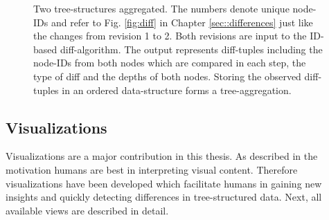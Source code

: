 \begin{figure}[tb]
\caption{\label{fig:aggregation} Two tree-structures aggregated. The numbers denote unique node-IDs and refer to Fig. \ref{fig:diff} in Chapter \ref{sec::differences} just like the changes from revision 1 to 2. Both revisions are input to the ID-based diff-algorithm. The output represents diff-tuples including the node-IDs from both nodes which are compared in each step, the type of diff and the depths of both nodes. Storing the observed diff-tuples in an ordered data-structure forms a tree-aggregation.}
\end{figure} 

\subsection{Visualizations}
Visualizations are a major contribution in this thesis. As described in the motivation humans are best in interpreting visual content. Therefore visualizations have been developed which facilitate humans in gaining new insights and quickly detecting differences in tree-structured data. Next, all available views are described in detail. %

